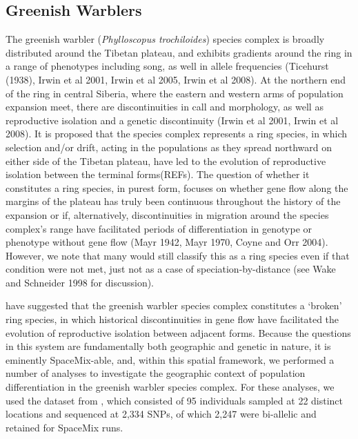 \documentclass[12pt]{article}
\begin{document}
\subsection*{Greenish Warblers}  
The greenish warbler (\textit{Phylloscopus trochiloides}) species complex is broadly distributed around the Tibetan plateau, and exhibits gradients around the ring in a range of phenotypes including song, as well in allele frequencies (Ticehurst (1938), Irwin et al 2001, Irwin et al 2005, Irwin et al 2008).  At the northern end of the ring in central Siberia, where the eastern and western arms of population expansion meet, there are discontinuities in call and morphology, as well as reproductive isolation and a genetic discontinuity (Irwin et al 2001, Irwin et al 2008). It is proposed that the species complex represents a ring species, in which selection and/or drift, acting in the populations as they spread northward on either side of the Tibetan plateau, have led to the evolution of reproductive isolation between the terminal forms(REFs).  The question of whether it constitutes a ring species, in purest form, focuses on whether gene flow along the margins of the plateau has truly been continuous throughout the history of the expansion or if, alternatively, discontinuities in migration around the species complex's range have facilitated periods of differentiation in genotype or phenotype without gene flow (Mayr 1942, Mayr 1970, Coyne and Orr 2004).  However, we note that many would still classify this as a ring species even if that condition were not met, just not as a case of speciation-by-distance (see Wake and Schneider 1998 for discussion).

\citet{alcaide2014genomic} have suggested that the greenish warbler species complex constitutes a `broken' ring species, in which historical discontinuities in gene flow have facilitated the evolution of reproductive isolation between adjacent forms.  Because the questions in this system are fundamentally both geographic and genetic in nature, it is eminently SpaceMix-able, and, within this spatial framework, we performed a number of analyses to investigate the geographic context of population differentiation in the greenish warbler species complex. For these analyses, we used the dataset from \citet{alcaide2014genomic}, which consisted of 95 individuals sampled at 22 distinct locations and sequenced at 2,334 SNPs, of which 2,247 were bi-allelic and retained for SpaceMix runs.
\end{document}
